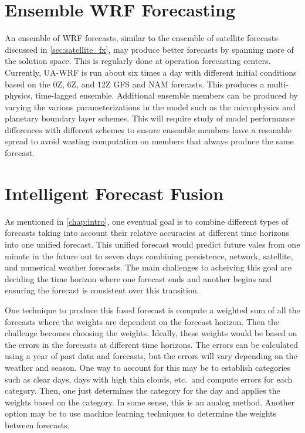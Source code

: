 \section{Ensemble WRF Forecasting}

An ensemble of WRF forecasts, similar to the ensemble of satellite
forecasts discussed in \cref{sec:satellite_fx}, may produce better
forecasts by spanning more of the solution space.
This is regularly done at operation forecasting centers.
Currently, UA-WRF is run about six times a day with different initial
conditions based on the 0Z, 6Z, and 12Z GFS and NAM forecasts.
This produces a multi-physics, time-lagged ensemble.
Additional ensemble members can be produced by varying the various
parameterizations in the model such as the microphysics and planetary
boundary layer schemes.
This will require study of model performance differences with
different schemes to ensure ensemble members have a resonable spread
to avoid wasting computation on members that always produce the same
forecast.

\section{Intelligent Forecast Fusion}

As mentioned in \cref{chap:intro}, one eventual goal is to combine
different types of forecasts taking into account their relative
accuracies at different time horizons into one unified forecast.
This unified forecast would predict future vales from one minute in
the future out to seven days combining persistence, network,
satellite, and numerical weather forecasts.
The main challenges to acheiving this goal are deciding the time
horizon where one forecast ends and another begins and ensuring the
forecast is consistent over this transition.

One technique to produce this fused forecast is compute a weighted sum
of all the forecasts where the weights are dependent on the forecast
horizon.
Then the challenge becomes choosing the weights.
Ideally, these weights would be based on the errors in the forecasts
at different time horizons.
The errors can be calculated using a year of past data and forecasts,
but the errors will vary depending on the weather and season.
One way to account for this may be to establish categories such as
clear days, days with high thin clouds, etc.\ and compute errors for
each category.
Then, one just determines the category for the day and applies the
weights based on the category.
In some sense, this is an analog method.
Another option may be to use machine learning techniques to determine
the weights between forecasts.

